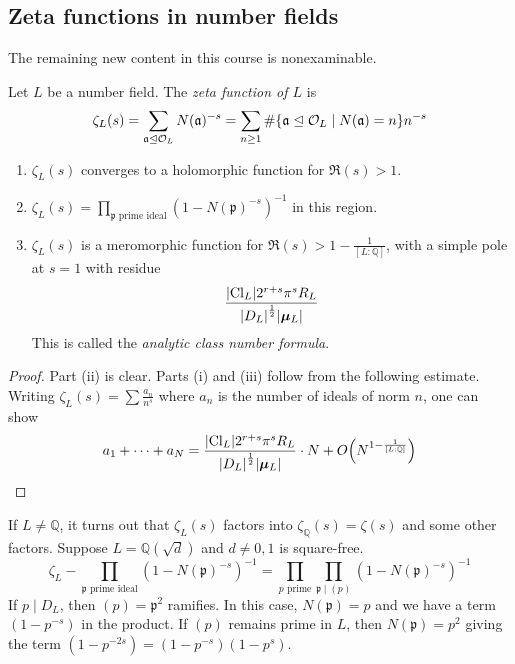 \subsection{Zeta functions in number fields}
The remaining new content in this course is nonexaminable.
\begin{definition}
    Let \( L \) be a number field.
    The \emph{zeta function of \( L \)} is
    \[ \zeta_L(s) = \sum_{\mathfrak a \trianglelefteq \mathcal O_L} N(\mathfrak a)^{-s} = \sum_{n \geq 1} \#\qty{\mathfrak a \trianglelefteq \mathcal O_L \mid N(\mathfrak a) = n} n^{-s} \]
\end{definition}
\begin{proposition}
    \begin{enumerate}
        \item \( \zeta_L(s) \) converges to a holomorphic function for \( \Re(s) > 1 \).
        \item \( \zeta_L(s) = \prod_{\mathfrak p \text{ prime ideal}} (1 - N(\mathfrak p)^{-s})^{-1} \) in this region.
        \item \( \zeta_L(s) \) is a meromorphic function for \( \Re(s) > 1 - \frac{1}{[L:\mathbb Q]} \), with a simple pole at \( s = 1 \) with residue
        \[ \frac{\abs{\mathrm{Cl}_L} 2^{r+s} \pi^s R_L}{\abs{D_L}^{\frac{1}{2}} \abs{\bm\mu_L}} \]
        This is called the \emph{analytic class number formula}.
    \end{enumerate}
\end{proposition}
\begin{proof}
    Part (ii) is clear.
    Parts (i) and (iii) follow from the following estimate.
    Writing \( \zeta_L(s) = \sum \frac{a_n}{n^s} \) where \( a_n \) is the number of ideals of norm \( n \), one can show
    \[ a_1 + \dots + a_N = \frac{\abs{\mathrm{Cl}_L} 2^{r+s} \pi^s R_L}{\abs{D_L}^{\frac{1}{2}} \abs{\bm\mu_L}} \cdot N + O\qty(N^{1 - \frac{1}{[L:\mathbb Q]}}) \]
\end{proof}
If \( L \neq \mathbb Q \), it turns out that \( \zeta_L(s) \) factors into \( \zeta_{\mathbb Q}(s) = \zeta(s) \) and some other factors.
Suppose \( L = \mathbb Q(\sqrt{d}) \) and \( d \neq 0, 1 \) is square-free.
\[ \zeta_L - \prod_{\mathfrak p \text{ prime ideal}} (1 - N(\mathfrak p)^{-s})^{-1} = \prod_{p \text{ prime}} \prod_{\mathfrak p \mid (p)} (1 - N(\mathfrak p)^{-s})^{-1} \]
If \( p \mid D_L \), then \( (p) = \mathfrak p^2 \) ramifies.
In this case, \( N(\mathfrak p) = p \) and we have a term \( (1 - p^{-s}) \) in the product.
If \( (p) \) remains prime in \( L \), then \( N(\mathfrak p) = p^2 \) giving the term \( (1 - p^{-2s}) = (1 - p^{-s})(1 - p^s) \).
